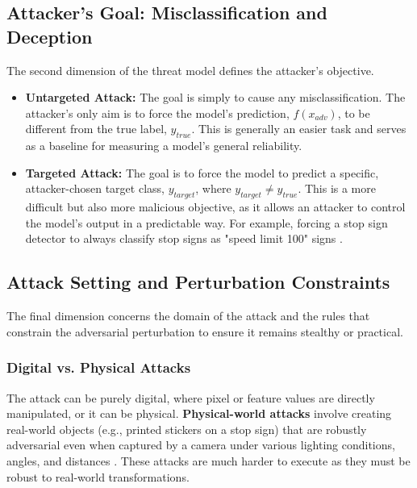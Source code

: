 \documentclass[../main.tex]{subfiles}
\begin{document}
\subsection{Attacker's Goal: Misclassification and Deception}
The second dimension of the threat model defines the attacker's objective.
\begin{itemize}
    \item \textbf{Untargeted Attack:} The goal is simply to cause any misclassification. The attacker's only aim is to force the model's prediction, $f(x_{adv})$, to be different from the true label, $y_{true}$. This is generally an easier task and serves as a baseline for measuring a model's general reliability.
    \item \textbf{Targeted Attack:} The goal is to force the model to predict a specific, attacker-chosen target class, $y_{target}$, where $y_{target} \neq y_{true}$. This is a more difficult but also more malicious objective, as it allows an attacker to control the model's output in a predictable way. For example, forcing a stop sign detector to always classify stop signs as "speed limit 100" signs \cite{carlini2017evaluatingrobustnessneuralnetworks}.
\end{itemize}

\subsection{Attack Setting and Perturbation Constraints}
The final dimension concerns the domain of the attack and the rules that constrain the adversarial perturbation to ensure it remains stealthy or practical.

\subsubsection{Digital vs. Physical Attacks}
The attack can be purely digital, where pixel or feature values are directly manipulated, or it can be physical. \textbf{Physical-world attacks} involve creating real-world objects (e.g., printed stickers on a stop sign) that are robustly adversarial even when captured by a camera under various lighting conditions, angles, and distances \cite{3d_physical_attacks, kurakin2017adversarialmachinelearningscale}. These attacks are much harder to execute as they must be robust to real-world transformations.
\end{document}
